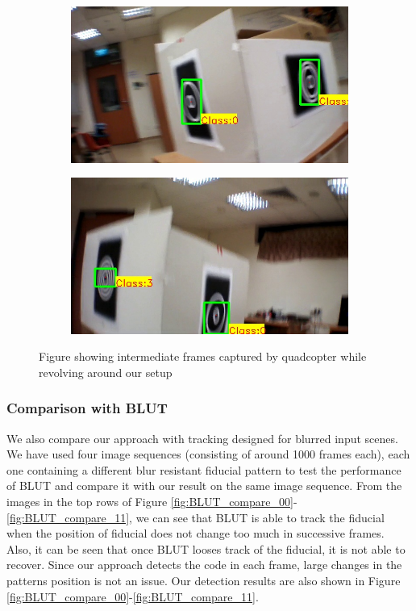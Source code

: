 \documentclass[10pt,twocolumn,letterpaper]{article}
\begin{document}
\begin{figure}
\begin{subfigure}[b]{.19\textwidth}
\end{subfigure}
\begin{subfigure}[b]{.19\textwidth}
\includegraphics[width=\linewidth]{setup_our/output_2/output_330.jpg}
\end{subfigure}
\begin{subfigure}[b]{.19\textwidth}
\includegraphics[width=\linewidth]{setup_our/output_6/output_943.jpg}
\end{subfigure}
\caption{Figure showing intermediate frames captured by quadcopter while
revolving around our setup}
\label{fig:setup}
\end{figure}
\subsubsection{Comparison with BLUT}

We also compare our approach with tracking designed for blurred input scenes.
We have used four image sequences (consisting of around 1000 frames each), each
one containing a different blur resistant fiducial pattern to test the performance of
BLUT \cite{Wu:2011} and compare it with our result on the same image sequence.
From the images in the top rows of Figure
\ref{fig:BLUT_compare_00}-\ref{fig:BLUT_compare_11}, we can see that BLUT is
able to track the fiducial when the position of fiducial does not change too
much in successive frames. Also, it can be seen that once BLUT looses 
track of the fiducial, it is not able to recover. Since our approach detects the
code in each frame, large changes in the patterns position is not an issue.
Our detection results are also shown in Figure
\ref{fig:BLUT_compare_00}-\ref{fig:BLUT_compare_11}.
\end{document}
